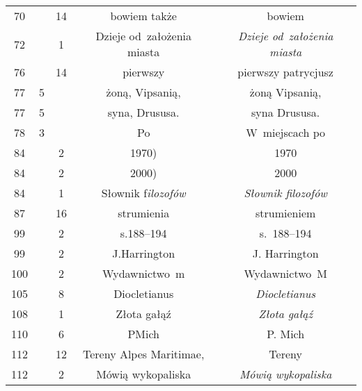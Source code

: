 \documentclass[a4paper,11pt]{article}
\begin{document}
\begin{center}
\begin{tabular}{|c|c|c|c|c|}
    70  & & 14 & bowiem także & bowiem \\
    72  & &  1 &  Dzieje od~założenia miasta
           & \emph{Dzieje od~założenia miasta} \\
    76  & & 14 & pierwszy & pierwszy patrycjusz \\
    77  &  5 & & żoną, Vipsanią, & żoną Vipsanią, \\
    77  &  5 & & syna, Drususa. & syna Drususa. \\
    78  &  3 & & Po & W~miejscach po \\
    84  & &  2 & 1970) & 1970 \\
    84  & &  2 & 2000) & 2000 \\
    84  & &  1 & Słownik f\emph{ilozofów} & \emph{Słownik filozofów} \\
    87  & & 16 & strumienia & strumieniem \\
    99  & &  2 & s.188--194 & s.~188--194 \\
    99  & &  2 & J.Harrington & J. Harrington \\
    100 & &  2 & Wydawnictwo~m & Wydawnictwo~M \\
    105 & &  8 & Diocletianus & \emph{Diocletianus} \\
    108 & &  1 & Złota gałąź & \emph{Złota gałąź} \\
    110 & &  6 & PMich & P. Mich \\
    112 & & 12 & Tereny Alpes Maritimae, & Tereny \\
    112 & &  2 & Mówią wykopaliska & \emph{Mówią wykopaliska} \\
    \hline
  \end{tabular}






\end{center}
\end{document}
